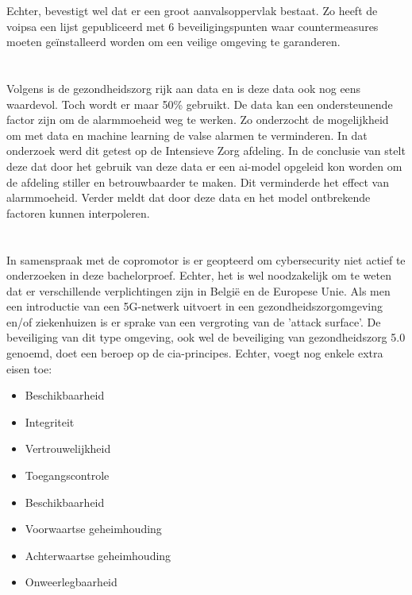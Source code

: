 Echter, \textcite{Soenmez2018} bevestigt wel dat er een groot aanvalsoppervlak bestaat. Zo heeft de \gls{voipsa} een lijst gepubliceerd met 6 beveiligingspunten waar countermeasures moeten geïnstalleerd worden om een veilige omgeving te garanderen.

\section{}%
\label{sec:data}%

Volgens \textcite{Niekerk2020} is de gezondheidszorg rijk aan data en is deze data ook nog eens waardevol. Toch wordt er maar 50\% gebruikt.
De data kan een ondersteunende factor zijn om de alarmmoeheid weg te werken. Zo onderzocht \textcite{Hever2019} de mogelijkheid om met data en machine learning de valse alarmen te verminderen. In dat onderzoek werd dit getest op de Intensieve Zorg afdeling. In de conclusie van \textcite{Hever2019} stelt deze dat door het gebruik van deze data er een \gls{ai}-model opgeleid kon worden om de afdeling stiller en betrouwbaarder te maken. Dit verminderde het effect van alarmmoeheid. Verder meldt \textcite{Hever2019} dat door deze data en het model  ontbrekende factoren kunnen interpoleren.

\section{}%
\label{sec:security}%

In samenspraak met de copromotor is er geopteerd om cybersecurity niet actief te onderzoeken in deze bachelorproef. Echter, het is wel noodzakelijk om te weten dat er verschillende verplichtingen zijn in België en de Europese Unie. Als men een introductie van een 5G-netwerk uitvoert in een gezondheidszorgomgeving en/of ziekenhuizen is er sprake van een vergroting van de 'attack surface'. De beveiliging van dit type omgeving, ook wel de beveiliging van gezondheidszorg 5.0 genoemd, doet een beroep op de \gls{cia}-principes. Echter, \textcite{Wazid2022} voegt nog enkele extra eisen toe:

\begin{itemize}
  \item Beschikbaarheid
  \item Integriteit
  \item Vertrouwelijkheid
  \item Toegangscontrole
  \item Beschikbaarheid
  \item Voorwaartse geheimhouding
  \item Achterwaartse geheimhouding
  \item Onweerlegbaarheid
\end{itemize}

